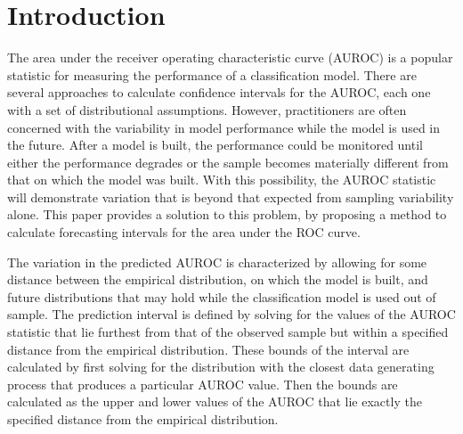 

\section{Introduction}



The area under the receiver operating characteristic curve (AUROC) is a popular statistic for measuring the performance of a classification model.
There are several approaches to calculate confidence intervals for the AUROC, each one with a set of distributional assumptions.
However, practitioners are often concerned with the variability in model performance while the model is used in the future.
After a model is built, the performance could be monitored until either the performance degrades or the sample becomes materially different from that on which the model was built.
% 
% 
With this possibility, the AUROC statistic will demonstrate variation that is beyond that expected from sampling variability alone.
This paper provides a solution to this problem, by proposing a method to calculate forecasting intervals for the area under the ROC curve.

The variation in the predicted AUROC is characterized by allowing for some distance between the empirical distribution, on which the model is built, and future distributions that may hold while the classification model is used out of sample.
The prediction interval is defined by solving for the values of the AUROC statistic that lie furthest from that of the observed sample but within a specified distance from the empirical distribution.
These bounds of the interval are calculated by first
solving for the distribution with
the closest data generating process
that produces a particular AUROC value.
%
Then the bounds are calculated as the upper and lower values of the AUROC that lie exactly the specified distance from the empirical distribution.


